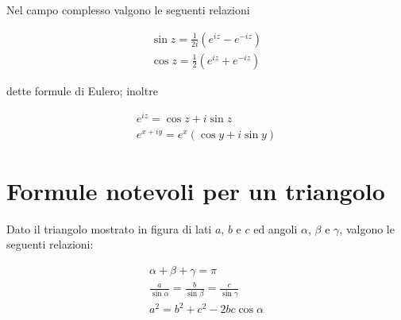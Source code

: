 \documentclass[10pt,a4paper]{book}
\begin{document}
Nel campo complesso valgono le seguenti relazioni

\begin{equation*}
	\begin{array}{ c }
		\sin z=\frac{1}{2i}\left( e^{iz} -e^{-iz}\right)\\
		[4mm]
		\cos z=\frac{1}{2}\left( e^{iz} +e^{-iz}\right)
	\end{array}
\end{equation*}

dette formule di Eulero; inoltre

\begin{equation*}
	\begin{array}{ c }
		e^{iz} =\cos z+i\sin z\\
		[4mm]
		e^{x+iy} =e^x(\cos y+i\sin y)
	\end{array}
\end{equation*}







































\section*{Formule notevoli per un triangolo}

Dato il triangolo mostrato in figura di lati $\displaystyle a$, $\displaystyle b$ e $\displaystyle c$ ed angoli $\displaystyle \alpha$, $\displaystyle \beta $ e $\displaystyle \gamma$, valgono le seguenti relazioni:

\begin{equation*}
	\begin{array}{ c }
		\alpha +\beta +\gamma =\pi \\
		[4mm]
		\frac{a}{\sin \alpha } =\frac{b}{\sin \beta } =\frac{c}{\sin \gamma }\\
		[4mm]
		a^2 =b^2 +c^2 -2bc\cos \alpha
	\end{array}
\end{equation*}
\end{document}
